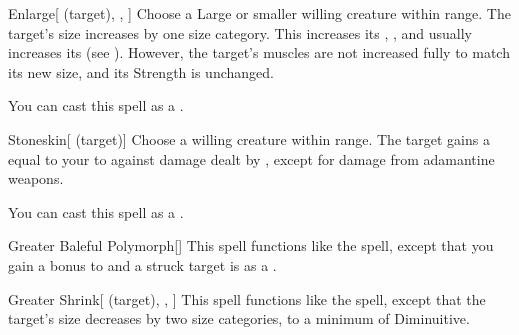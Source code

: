 \lowercase{\hypertarget{spell:Enlarge}{}}\label{spell:Enlarge}
\begin{attuneability}[\nth{3}]{\hypertarget{spell:Enlarge}{Enlarge}}[ (target), , ]
Choose a Large or smaller willing creature within \rngclose range.
The target's size increases by one size category.
This increases its , , and usually increases its  (see ).
However, the target's muscles are not increased fully to match its new size, and its Strength is unchanged.

You can cast this spell as a .
\end{attuneability}
\vspace{0.25em}



\lowercase{\hypertarget{spell:Stoneskin}{}}\label{spell:Stoneskin}
\begin{attuneability}[\nth{3}]{\hypertarget{spell:Stoneskin}{Stoneskin}}[ (target)]
Choose a willing creature within \rngclose range.
The target gains a  equal to your  to  against damage dealt by , except for damage from adamantine weapons.

You can cast this spell as a .
\end{attuneability}
\vspace{0.25em}



\lowercase{\hypertarget{spell:Greater Baleful Polymorph}{}}\label{spell:Greater Baleful Polymorph}
\begin{apability}[\nth{4}]{\hypertarget{spell:Greater Baleful Polymorph}{Greater Baleful Polymorph}}[]
This spell functions like the  spell, except that you gain a  bonus to  and a struck target is  as a .
\end{apability}
\vspace{0.25em}



\lowercase{\hypertarget{spell:Greater Shrink}{}}\label{spell:Greater Shrink}
\begin{attuneability}[\nth{4}]{\hypertarget{spell:Greater Shrink}{Greater Shrink}}[ (target), , ]
This spell functions like the  spell, except that the target's size decreases by two size categories, to a minimum of Diminuitive.
\end{attuneability}
\vspace{0.25em}



